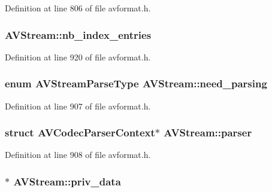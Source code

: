Definition at line 806 of file avformat.\+h.

\subsubsection[{\texorpdfstring{nb\+\_\+index\+\_\+entries}{nb_index_entries}}]{ A\+V\+Stream\+::nb\+\_\+index\+\_\+entries}\hypertarget{struct_a_v_stream_a79b269ebc3f36441cf8e8a8e8ea347f8}{}\label{struct_a_v_stream_a79b269ebc3f36441cf8e8a8e8ea347f8}


Definition at line 920 of file avformat.\+h.

\subsubsection[{\texorpdfstring{need\+\_\+parsing}{need_parsing}}]{\setlength{\rightskip}{0pt plus 5cm}enum {\bf A\+V\+Stream\+Parse\+Type} A\+V\+Stream\+::need\+\_\+parsing}\hypertarget{struct_a_v_stream_acd70b72d0c0514643a5c11b2c7c8202c}{}\label{struct_a_v_stream_acd70b72d0c0514643a5c11b2c7c8202c}


Definition at line 907 of file avformat.\+h.

\subsubsection[{\texorpdfstring{parser}{parser}}]{\setlength{\rightskip}{0pt plus 5cm}struct {\bf A\+V\+Codec\+Parser\+Context}$\ast$ A\+V\+Stream\+::parser}\hypertarget{struct_a_v_stream_a5b1079c1e244d644a86457e7e27545c1}{}\label{struct_a_v_stream_a5b1079c1e244d644a86457e7e27545c1}


Definition at line 908 of file avformat.\+h.

\subsubsection[{\texorpdfstring{priv\+\_\+data}{priv_data}}]{$\ast$ A\+V\+Stream\+::priv\+\_\+data}\hypertarget{struct_a_v_stream_a61b61b0d009be377ebcfdc30ea053d27}{}\label{struct_a_v_stream_a61b61b0d009be377ebcfdc30ea053d27}


